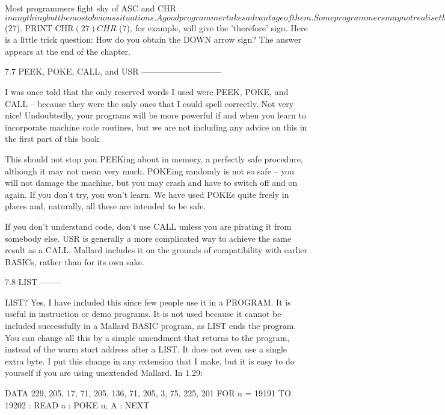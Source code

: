 Most  programmers fight shy of ASC and CHR$ in anything but the  most  obvious 
situations. A good programmer takes advantage of them.

Some  programmers may not realise that Greek and mathematical  characters  are 
available  from  Mallard BASIC using ASCII codes under 32. To  produce  these, 
they have to be preceded by CHR$ (27). PRINT CHR$ (27) CHR$ (7), for  example, 
will  give the 'therefore' sign. Here is a little trick question: How  do  you 
obtain the DOWN arrow sign? The answer appears at the end of the chapter.


7.7 PEEK, POKE, CALL, and USR
-----------------------------

I was once told that the only reserved words I used were PEEK, POKE, and  CALL 
--  because  they were the only ones that I could spell  correctly.  Not  very 
nice!  Undoubtedly, your programs will be more powerful if and when you  learn 
to  incorporate machine code routines, but we are not including any advice  on 
this in the first part of this book.

This should not stop you PEEKing about in memory, a perfectly safe  procedure, 
although  it  may not mean very much. POKEing randomly is not so safe  --  you 
will  not damage the machine, but you may crash and have to switch off and  on 
again.  If you don't try, you won't learn. We have used POKEs quite freely  in 
places and, naturally, all these are intended to be safe.

If  you don't understand code, don't use CALL unless you are pirating it  from 
somebody  else.  USR is generally a more complicated way to achieve  the  same 
result  as  a CALL. Mallard includes it on the grounds of  compatibility  with 
earlier BASICs, rather than for its own sake.


7.8 LIST
--------

LIST?  Yes, I have included this since few people use it in a PROGRAM.  It  is 
useful  in instruction or demo programs. It is not used because it  cannot  be 
included  successfully in a Mallard BASIC program, as LIST ends  the  program. 
You  can  change all this by a simple amendment that returns to  the  program, 
instead of the warm start address after a LIST. It does not even use a  single 
extra byte. I put this change in any extension that I make, but it is easy  to 
do yourself if you are using unextended Mallard. In 1.29:

        DATA 229, 205, 17, 71, 205, 136, 71, 205, 3, 75, 225, 201
        FOR n = 19191 TO 19202 : READ a : POKE n, A : NEXT

